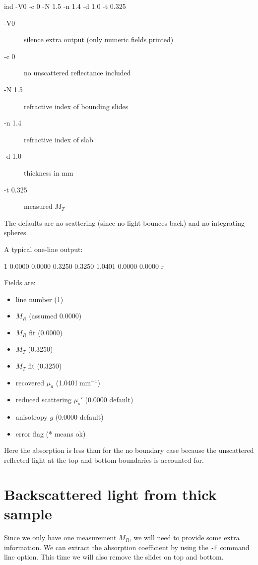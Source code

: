 \begin{grayverb}
iad -V0 -c 0 -N 1.5 -n 1.4 -d 1.0 -t 0.325
\end{grayverb}

\begin{description}
  \item[\ttfamily -V0] silence extra output (only numeric fields printed)  
  \item[\ttfamily -c 0] no unscattered reflectance included
  \item[\ttfamily -N 1.5] refractive index of bounding slides 
  \item[\ttfamily -n 1.4] refractive index of slab
  \item[\ttfamily -d 1.0] thickness in mm  
  \item[\ttfamily -t 0.325] measured $M_T$  
\end{description}

The defaults are no scattering (since no light bounces back) and no integrating spheres. 

A typical one-line output:
\begin{grayverb}
1 0.0000 0.0000 0.3250 0.3250 1.0401 0.0000 0.0000 r
\end{grayverb}

Fields are:
\begin{itemize}
  \item line number (1)
  \item $M_R$ (assumed 0.0000)  
  \item $M_R$ fit (0.0000)  
  \item $M_T$ (0.3250)  
  \item $M_T$ fit (0.3250)  
  \item recovered $\mu_a$ (1.0401 mm$^{-1}$)  
  \item reduced scattering $\mu_s'$ (0.0000 default)  
  \item anisotropy $g$ (0.0000 default)  
  \item error flag (* means ok)  
\end{itemize}

Here the absorption is less than for the no boundary case because the unscattered reflected light at the top and bottom boundaries is accounted for.

\section{Backscattered light from thick sample}
Since we only have one measurement $M_R$, we will need to provide some extra information.  We can extract the absorption coefficient by using the
\texttt{-F} command line option.  This time we will also remove the slides on top and bottom.

